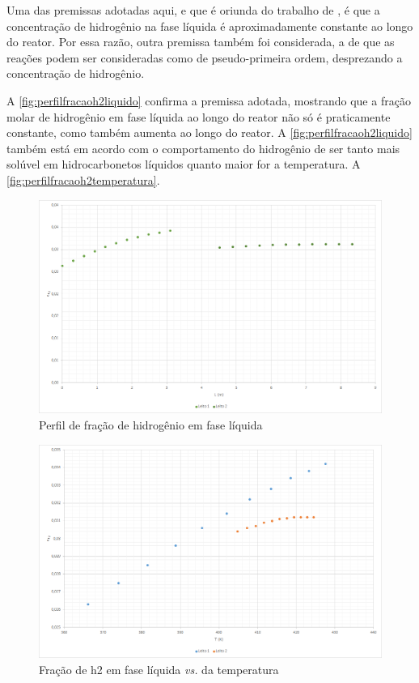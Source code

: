 Uma das premissas adotadas aqui, e que é oriunda do trabalho de
, é que a concentração de hidrogênio na
fase líquida é aproximadamente constante ao longo do reator. Por essa razão,
outra premissa também foi considerada, a de que as reações podem ser
consideradas como de pseudo-primeira ordem, desprezando a concentração de
hidrogênio.

A \autoref{fig:perfilfracaoh2liquido} confirma a premissa adotada, mostrando que
a fração molar de hidrogênio em fase líquida ao longo do reator não só é
praticamente constante, como também aumenta ao longo do reator. A
\autoref{fig:perfilfracaoh2liquido} também está em acordo com o
comportamento do hidrogênio de ser tanto mais solúvel em hidrocarbonetos
líquidos quanto maior for a temperatura. A
\autoref{fig:perfilfracaoh2temperatura}.

\begin{figure}[htb]
\centering \includegraphics[scale=0.4]{images/Chap4/perfilfracaoh2liquido.png}
\caption{Perfil de fração de hidrogênio em fase líquida}
\label{fig:perfilfracaoh2liquido}
\end{figure}

\begin{figure}[htb]
\centering
\includegraphics[scale=0.4]{images/Chap4/perfilfracaoh2temperatura.png}
\caption{Fração de h2 em fase líquida \emph{vs.} da temperatura}
\label{fig:perfilfracaoh2temperatura}
\end{figure}


